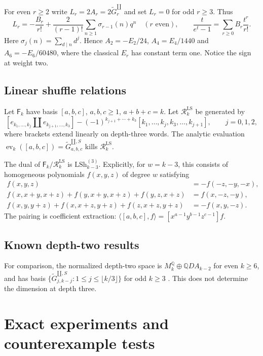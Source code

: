 \documentclass[12pt]{amsart}
\theoremstyle{definition}
\theoremstyle{remark}
\numberwithin{equation}{section}
\newcommand{\Q}{\mathbb{Q}}
\newcommand{\sh}{\mathbin{\amalg}}
\newcommand{\sG}[1]{\widetilde G^{\sh,S}_{#1}}
\newcommand{\LS}{\mathrm{LSh}}
\newcommand{\ev}{\operatorname{ev}}
\newcommand{\RR}{\mathcal R^{\mathrm{LS}}}
\newcommand{\FF}{\mathsf F}
\numberwithin{equation}{section}
\begin{document}
For even $r\ge2$ write $L_r=2A_r=2\widetilde G_r^{\sh}$ and set $L_r=0$
for odd $r\ge3$. Thus
\begin{equation}\label{e:fourier}
 L_r=-\frac{B_r}{r!}+\frac{2}{(r-1)!}\sum_{n\ge1}\sigma_{r-1}(n)q^n
 \quad(r\text{ even}),\qquad
 \frac{t}{e^t-1}=\sum_{r\ge0}B_r\frac{t^r}{r!}.
\end{equation}
Here $\sigma_j(n)=\sum_{d\mid n}d^j$.
Hence $A_2=-E_2/24$, $A_4=E_4/1440$ and $A_6=-E_6/60480$, where
the classical $E_r$ has constant term one. Notice the sign at weight two.

\subsection{Linear shuffle relations}
Let $\FF_k$ have basis $[a,b,c]$, $a,b,c\ge1$, $a+b+c=k$.
Let $\RR_k$ be generated by
\begin{equation}\label{e:lswords}
 [e_{k_1,\ldots,k_j}\sh e_{k_{j+1},\ldots,k_3}]
 -(-1)^{k_{j+1}+\cdots+k_3}
 [k_1,\ldots,k_j,k_3,\ldots,k_{j+1}],\qquad j=0,1,2,
\end{equation}
where brackets extend linearly on depth-three words.
The analytic evaluation $\ev_k([a,b,c])=\sG{a,b,c}$ kills $\RR_k$.

The dual of $\FF_k/\RR_k$ is $\LS_{k-3}^{(3)}$. Explicitly, for $w=k-3$,
this consists of homogeneous polynomials $f(x,y,z)$ of degree $w$ satisfying
\begin{align}
 f(x,y,z)&=-f(-z,-y,-x),\label{e:rev}\\
 f(x,x+y,x+z)+f(y,x+y,x+z)+f(y,z,x+z)&=f(x,-z,-y),\label{e:ls1}\\
 f(x,y,y+z)+f(x,x+z,y+z)+f(z,x+z,y+z)&=-f(x,y,-z).\label{e:ls2}
\end{align}
The pairing is coefficient extraction:
$\langle[a,b,c],f\rangle=[x^{a-1}y^{b-1}z^{c-1}]f$.

\subsection{Known depth-two results}
For comparison, the normalized depth-two space is
$M_k^{\Q}\oplus\Q D A_{k-2}$ for even $k\ge6$, and has basis
$\{\sG{j,k-j}:1\le j\le\lfloor k/3\rfloor\}$ for odd $k\ge3$
\cite[Theorem 1.2]{hst}. This does not determine the dimension at depth three.

\section{Exact experiments and counterexample tests}
\end{document}

